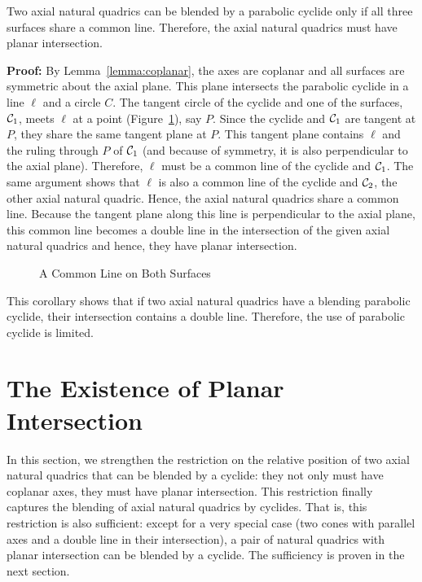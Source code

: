 \begin{corollary}
\label{cor:para->common-line}
     Two axial natural quadrics can be blended by a parabolic cyclide only if
all three surfaces share a common line.  Therefore, the axial natural quadrics
must have planar intersection.
\end{corollary}
{\bf Proof:} By Lemma~\ref{lemma:coplanar}, the axes are coplanar and all
surfaces are symmetric about the axial plane.  This plane intersects the 
parabolic cyclide in a line $\ell$ and a circle $C$.  The tangent circle of 
the cyclide and one of the surfaces, ${\cal C}_1$, meets $\ell$ at a point 
(Figure~\ref{fig:para->plane}), say $P$.  Since the cyclide and ${\cal C}_1$ 
are tangent at $P$, they share the same tangent plane at $P$.  
This tangent plane contains $\ell$ and the ruling through $P$ of ${\cal C}_1$
(and because of symmetry, it is also perpendicular to the axial plane).  
Therefore, $\ell$ must be a common line of the cyclide and ${\cal C}_1$.  
The same argument shows that $\ell$ is also a common line of the cyclide 
and ${\cal C}_2$, the other axial natural quadric.  Hence, the axial natural
quadrics share a common line.  Because the tangent plane along this line is
perpendicular to the axial plane, this common line becomes a double line
in the intersection of the given axial natural quadrics and hence,
they have planar intersection.  \QED
\begin{figure}
\vspace{4.5cm}
\caption{A Common Line on Both Surfaces}
\label{fig:para->plane}
\end{figure}

     This corollary shows that if two axial natural quadrics have a blending
parabolic cyclide, their intersection contains a double line.  Therefore, the 
use of parabolic cyclide is limited.


\section{The Existence of Planar Intersection}
\label{section:planar}

     In this section, we strengthen the restriction on the relative position
of two axial natural quadrics that can be blended by a cyclide: they not only 
must have coplanar axes, they must have planar intersection.  This restriction
finally captures the blending of axial natural quadrics by cyclides.
That is, this restriction is also sufficient: except for a very special case
(two cones with parallel axes and a double line in their intersection),
a pair of natural quadrics with planar intersection can be blended by a
cyclide.  The sufficiency is proven in the next section.

